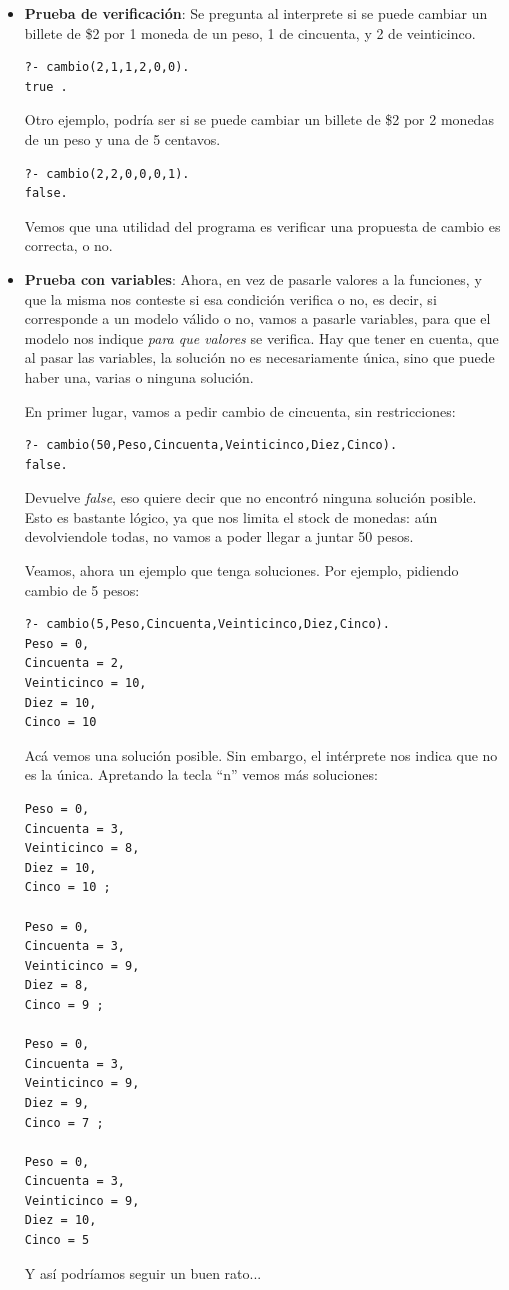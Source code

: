 \documentclass[12pt,titlepage]{article}
\begin{document}
\begin{itemize}
 \item \textbf{Prueba de verificación}: Se pregunta al interprete si se puede cambiar un billete de \$2 por 1 moneda de un peso, 1 de cincuenta, y 2 de veinticinco.

\begin{lstlisting}
?- cambio(2,1,1,2,0,0).
true . 
\end{lstlisting}

Otro ejemplo, podría ser si se puede cambiar un billete de \$2 por 2 monedas de un peso y una de 5 centavos.
\begin{lstlisting}
?- cambio(2,2,0,0,0,1).
false.
\end{lstlisting}

Vemos que una utilidad del programa es verificar una propuesta de cambio es correcta, o no.

 \item \textbf{Prueba con variables}: Ahora, en vez de pasarle valores a la funciones, y que la misma nos conteste si esa condición verifica o no, es decir, si corresponde a un modelo válido o no, vamos a pasarle variables, para que el modelo nos indique \textit{para que valores} se verifica. Hay que tener en cuenta, que al pasar las variables, la solución no es necesariamente única, sino que puede haber una, varias o ninguna solución.

En primer lugar, vamos a pedir cambio de cincuenta, sin restricciones:
\begin{lstlisting}
?- cambio(50,Peso,Cincuenta,Veinticinco,Diez,Cinco).
false.
\end{lstlisting}
Devuelve \textit{false}, eso quiere decir que no encontró ninguna solución posible. Esto es bastante lógico, ya que nos limita el stock de monedas: aún devolviendole todas, no vamos a poder llegar a juntar 50 pesos.

Veamos, ahora un ejemplo que tenga soluciones. Por ejemplo, pidiendo cambio de 5 pesos:
\begin{lstlisting}
?- cambio(5,Peso,Cincuenta,Veinticinco,Diez,Cinco).
Peso = 0,
Cincuenta = 2,
Veinticinco = 10,
Diez = 10,
Cinco = 10 
\end{lstlisting}
Acá vemos una solución posible. Sin embargo, el intérprete nos indica que no es la única. Apretando la tecla ``n'' vemos más soluciones:
\begin{lstlisting}
Peso = 0,
Cincuenta = 3,
Veinticinco = 8,
Diez = 10,
Cinco = 10 ;

Peso = 0,
Cincuenta = 3,
Veinticinco = 9,
Diez = 8,
Cinco = 9 ;

Peso = 0,
Cincuenta = 3,
Veinticinco = 9,
Diez = 9,
Cinco = 7 ;

Peso = 0,
Cincuenta = 3,
Veinticinco = 9,
Diez = 10,
Cinco = 5 
\end{lstlisting}

Y así podríamos seguir un buen rato...

\end{itemize}
\end{document}
